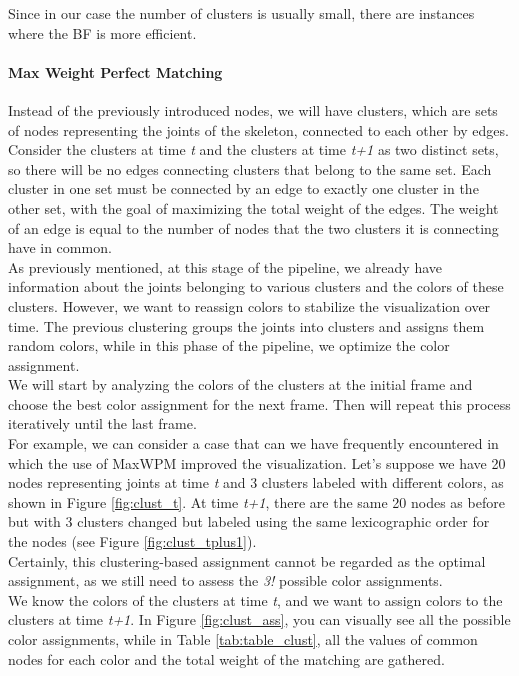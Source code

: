 Since in our case the number of clusters is usually small, there are instances where the BF is more efficient.

\paragraph{Max Weight Perfect Matching}
Instead of the previously introduced nodes, we will have clusters, which are sets of nodes representing the joints of the skeleton, connected to each other by edges.\\  
Consider the clusters at time \textit{t} and the clusters at time \textit{t+1} as two distinct sets, so there will be no edges connecting clusters that belong to the same set.
Each cluster in one set must be connected by an edge to exactly one cluster in the other set, with the goal of maximizing the total weight of the edges.
The weight of an edge is equal to the number of nodes that the two clusters it is connecting have in common.\\
As previously mentioned, at this stage of the pipeline, we already have information about the joints belonging to various clusters and the colors of these clusters. However, we want to reassign colors to stabilize the visualization over time.
The previous clustering groups the joints into clusters and assigns them random colors, while in this phase of the pipeline, we optimize the color assignment.\\
We will start by analyzing the colors of the clusters at the initial frame and choose the best color assignment for the next frame.
Then will repeat this process iteratively until the last frame.\\
For example, we can consider a case that can we have frequently encountered in which the use of MaxWPM improved the visualization.
Let's suppose we have 20 nodes representing joints at time \textit{t} and 3 clusters labeled with different colors, as shown in Figure \ref{fig:clust_t}.
At time \textit{t+1}, there are the same 20 nodes as before but with 3 clusters changed but labeled using the same lexicographic order for the nodes (see Figure \ref{fig:clust_tplus1}). \\
Certainly, this clustering-based assignment cannot be regarded as the optimal assignment, as we still need to assess the \textit{3!} possible color assignments. \\
We know the colors of the clusters at time \textit{t}, and we want to assign colors to the clusters at time \textit{t+1}. 
In Figure \ref{fig:clust_ass}, you can visually see all the possible color assignments, while in Table \ref{tab:table_clust}, all the values of common nodes for each color and the total weight of the matching are gathered.


